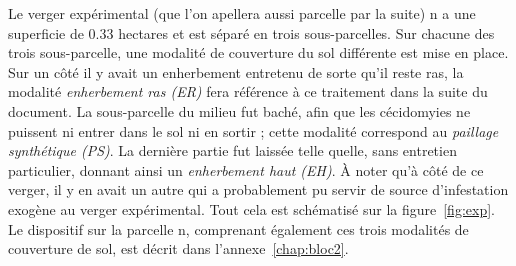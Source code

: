 Le verger expérimental (que l'on apellera aussi parcelle par la suite) n a une superficie de 0.33 hectares et est séparé en trois sous-parcelles.
Sur chacune des trois sous-parcelle, une modalité de couverture du sol différente est mise en place.
Sur un côté il y avait un enherbement entretenu de sorte qu'il reste ras, la modalité \emph{enherbement ras (ER)} fera référence à ce traitement dans la suite du document.
La sous-parcelle du milieu fut baché, afin que les cécidomyies ne puissent ni entrer dans le sol ni en sortir ; cette modalité correspond au \emph{paillage synthétique (PS)}. 
La dernière partie fut laissée telle quelle, sans entretien particulier, donnant ainsi un \emph{enherbement haut (EH)}.
À noter qu'à côté de ce verger, il y en avait un autre qui a probablement pu servir de source d'infestation exogène au verger expérimental.
Tout cela est schématisé sur la figure~\ref{fig:exp}.
Le dispositif sur la parcelle n, comprenant également ces trois modalités de couverture de sol, est décrit dans l'annexe~\ref{chap:bloc2}.
